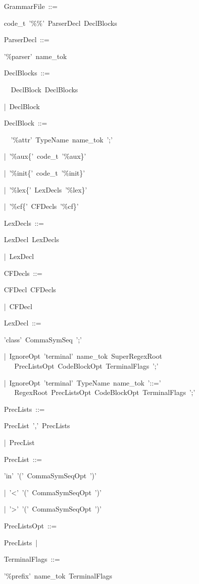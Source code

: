 \documentclass[12pt,english,twoside]{report}
\newenvironment{codeblock}
{\begin{list}{}{
\setlength{\rightmargin}{\leftmargin}
\setlength{\listparindent}{0pt}%
\raggedright
\setlength{\itemsep}{0pt}
\setlength{\parsep}{0pt}
\normalfont\ttfamily}%
 \item[]}
{\end{list}}
\begin{document}
\begin{codeblock}
GrammarFile~::=~
\begin{codeblock}
code\_t~'\%\%'~ParserDecl~DeclBlocks
\end{codeblock}
ParserDecl~::=
\begin{codeblock}
'\%parser'~name\_tok
\end{codeblock}
DeclBlocks~::=
\begin{codeblock}
~~DeclBlock~DeclBlocks

|~DeclBlock
\end{codeblock}
DeclBlock~::=
\begin{codeblock}
~~'\%attr'~TypeName~name\_tok~';'

|~'\%aux\{'~code\_t~'\%aux\}'

|~'\%init\{'~code\_t~'\%init\}'

|~'\%lex\{'~LexDecls~'\%lex\}'

|~'\%cf\{'~CFDecls~'\%cf\}'
\end{codeblock}
LexDecls~::=
\begin{codeblock}
LexDecl~LexDecls

|~LexDecl
\end{codeblock}
CFDecls~::=
\begin{codeblock}
CFDecl~CFDecls

|~CFDecl
\end{codeblock}
LexDecl~::=
\begin{codeblock}
'class'~CommaSymSeq~';'

|~IgnoreOpt~'terminal'~name\_tok~SuperRegexRoot~\\
~~~PrecListsOpt~CodeBlockOpt~TerminalFlags~';'

|~IgnoreOpt~'terminal'~TypeName~name\_tok~'::='~\\
~~~RegexRoot~PrecListsOpt~CodeBlockOpt~TerminalFlags~';'
\end{codeblock}
PrecLists~::=
\begin{codeblock}
PrecList~','~PrecLists

|~PrecList
\end{codeblock}
PrecList~::=
\begin{codeblock}
'in'~'('~CommaSymSeqOpt~')'

|~'<'~'('~CommaSymSeqOpt~')'

|~'>'~'('~CommaSymSeqOpt~')'
\end{codeblock}
PrecListsOpt~::=
\begin{codeblock}
PrecLists~|
\end{codeblock}
TerminalFlags~::=
\begin{codeblock}
'\%prefix'~name\_tok~TerminalFlags


\end{codeblock}
\end{codeblock}
\end{document}

